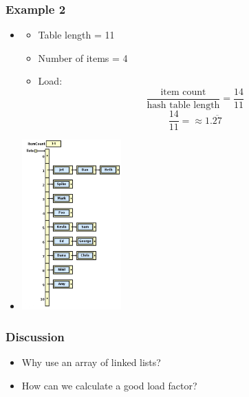 \documentclass[10pt]{article}
\begin{document}
\subsubsection*{Example 2}
\begin{multicols}{2}
\begin{itemize}
\item[]\begin{minipage}[t]{\linewidth}
\begin{itemize}
    \item Table length = 11
    \item Number of items = 4
    \item Load:
     $$\frac{\text{item count}}{\text{hash table length}} = \frac{14}{11}$$
     $$\frac{14}{11} = \approx 1.\overline{27}$$
\end{itemize}
\end{minipage}
\item[] \includegraphics[width=0.3\textwidth]{images/3.png}
\end{itemize}
\end{multicols}

\subsubsection*{Discussion}
\begin{itemize}
    \item Why use an array of linked lists?
    \item How can we calculate a good load factor?
\end{itemize}
\end{document}

